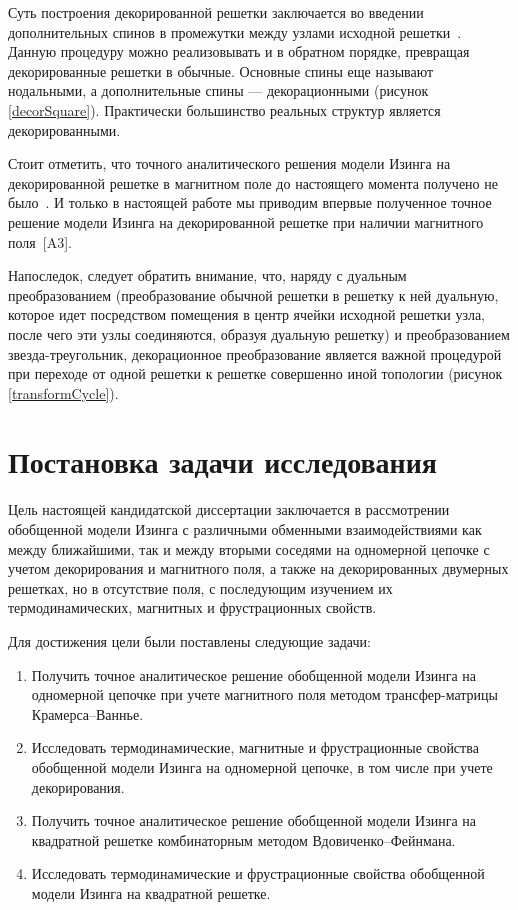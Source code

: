 Суть построения декорированной решетки заключается во введении дополнительных спинов в промежутки между узлами исходной решетки~\cite{siozi_domb1972}. Данную процедуру можно реализовывать и в обратном порядке, превращая декорированные решетки в обычные. Основные спины еще называют нодальными, а дополнительные спины --- декорационными (рисунок \ref{decorSquare}). Практически большинство реальных структур является декорированными.

Стоит отметить, что точного аналитического решения модели Изинга на декорированной решетке в магнитном поле до настоящего момента получено не было~\cite{kassan-ogly2019, proshkin2019, kassan-ogly2020}. И только в настоящей работе мы приводим впервые полученное точное решение модели Изинга на декорированной решетке при наличии магнитного поля~[A3].

Напоследок, следует обратить внимание, что, наряду с дуальным преобразованием (преобразование обычной решетки в решетку к ней дуальную, которое идет посредством помещения в центр ячейки исходной решетки узла, после чего эти узлы соединяются, образуя дуальную решетку) и преобразованием \guillemotleft звезда-треугольник\guillemotright \hspace{1pt}, декорационное преобразование является важной процедурой при переходе от одной решетки к решетке совершенно иной топологии (рисунок \ref{transformCycle}).

\section{Постановка задачи исследования}

Цель настоящей кандидатской диссертации заключается в рассмотрении обобщенной модели Изинга с различными обменными взаимодействиями как между ближайшими, так и между вторыми соседями на одномерной цепочке с учетом декорирования и магнитного поля, а также на декорированных двумерных решетках, но в отсутствие поля, с последующим изучением их термодинамических, магнитных и фрустрационных свойств.

Для достижения цели были поставлены следующие задачи:
\begin{enumerate}
    \item Получить точное аналитическое решение обобщенной модели Изинга на одномерной цепочке при учете магнитного поля методом трансфер-матрицы Крамерса--Ваннье.
    \item Исследовать термодинамические, магнитные и фрустрационные свойства обобщенной модели Изинга на одномерной цепочке, в том числе при учете декорирования.
    \item Получить точное аналитическое решение обобщенной модели Изинга на квадратной решетке комбинаторным методом Вдовиченко--Фейнмана.
    \item Исследовать термодинамические и фрустрационные свойства обобщенной модели Изинга на квадратной решетке.
\end{enumerate}

\FloatBarrier
